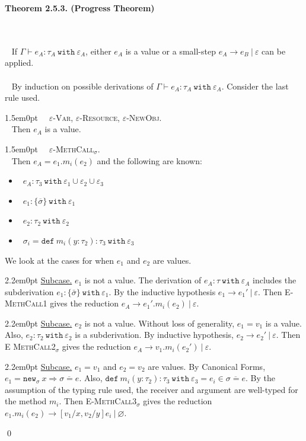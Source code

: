 \documentclass{llncs}
\newcommand{\keywadj}[1]{\mathtt{#1}}
\newcommand{\keyw}[1]{\keywadj{#1}~}
\newcommand{\thm}[3]{
	\begin{large}
		\bf{#1}
	\end{large} \\\\
	\fbox{Statement.} ~ #2
	\fbox{Proof.}~ #3 \qed
}
\newcommand{\proofcase}[2]{
	\begin{adjustwidth}{1.5em}{0pt}
		\fbox{Case.}~~#1. \\ ~#2
	\end{adjustwidth}
}
\newcommand{\subcase}[1] {
	\begin{adjustwidth}{2.2em}{0pt}
		\underline{Subcase.} #1
	\end{adjustwidth}
}
\begin{document}
\thm{Theorem 2.5.3. (Progress Theorem)}
{If $\Gamma \vdash e_A : \tau_A~\keyw{with} \varepsilon_A$, either $e_A$ is a value or a small-step $e_A \longrightarrow e_B~|~\varepsilon$ can be applied. \\\\}
{By induction on possible derivations of $\Gamma \vdash e_A : \tau_A~\keyw{with} \varepsilon_A$. Consider the last rule used. \\

	\proofcase{\textsc{$\varepsilon$-Var}, \textsc{$\varepsilon$-Resource}, \textsc{$\varepsilon$-NewObj}} {
		Then $e_A$ is a value. \\
	}
		
	\proofcase{\textsc{$\varepsilon$-MethCall$_\sigma$}} {
		Then $e_A = e_1.m_i(e_2)$ and the following are known:
		\begin{itemize}
			\item~$e_A : \tau_3~\keyw{with} \varepsilon_1 \cup \varepsilon_2 \cup \varepsilon_3$
			\item~$e_1  : \{ \overline \sigma \}~ \keyw{with} \varepsilon_1$
			\item~$e_2 : \tau_2~\keyw{with} \varepsilon_2$
			\item~$\sigma_i = \keyw{def} m_i(y : \tau_2) : \tau_3~ \keyw{with} \varepsilon_3$
		\end{itemize}
		We look at the cases for when $e_1$ and $e_2$ are values.
		
			\subcase{ $e_1$ is not a value. The derivation of $e_A : \tau~\keyw{with} \varepsilon_A$ includes the subderivation $e_1 : \{ \bar \sigma \}~\keyw{with} \varepsilon_1$. By the inductive hypothesis $e_1 \longrightarrow e_1'~|~\varepsilon$. Then \textsc{E-MethCall1} gives the reduction $e_A \longrightarrow e_1'.m_i(e_2)~|~\varepsilon$. }
	
			\subcase{ $e_2$ is not a value. Without loss of generality, $e_1 = v_1$ is a value. Also,
		$e_2 : \tau_2~\keyw{with} \varepsilon_2$ is a subderivation. By inductive hypothesis, $e_2 \longrightarrow e_2'~|~\varepsilon$. Then \textsc{E
		MethCall2$_{\sigma}$} gives the reduction $e_A \longrightarrow
		v_1.m_i(e_2')~|~\varepsilon$.}
		
			\subcase{ $e_1 = v_1$ and $e_2 = v_2$ are values. By Canonical Forms, $e_1 = \keywadj{new}_{\sigma}~x \Rightarrow \overline{\sigma = e}$. Also, $\keyw{def} m_i(y: \tau_2) : \tau_3~\keyw{with} \varepsilon_3 = e_i \in \overline{ \sigma = e }$. By the assumption of the typing rule used, the receiver and argument are well-typed for the method $m_i$. Then \textsc{E-MethCall3$_{\sigma}$} gives the reduction $e_1.m_i(e_2) \longrightarrow [v_1/x, v_2/y]e_i~|~\varnothing$.\\}

}}
\end{document}

